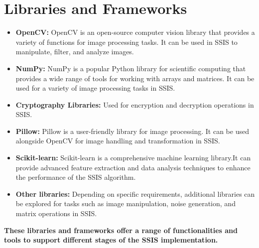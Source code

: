 \section{Libraries and Frameworks}
\begin{itemize}
\item \textbf{OpenCV:\cite{frwiki:197436603}} OpenCV is an open-source computer vision library that provides a variety of functions for image processing tasks. It can be used in SSIS to manipulate, filter, and analyze images.


\item \textbf{NumPy:\cite{frwiki:194233819}} NumPy is a popular Python library for scientific computing that provides a wide range of tools for working with arrays and matrices. It can be used for a variety of image processing tasks in SSIS.


\item \textbf{Cryptography Libraries:} Used for encryption and decryption operations in SSIS.


\item \textbf{Pillow:\cite{pillow}} Pillow is a user-friendly library for image processing. It can be used alongside OpenCV for image handling and transformation in SSIS.


\item \textbf{Scikit-learn:\cite{scikit-learn}} Scikit-learn is a comprehensive machine learning library.It can provide advanced feature extraction and data analysis techniques to enhance the performance of the SSIS algorithm.


\item \textbf{Other libraries:} Depending on specific requirements, additional libraries can be explored for tasks such as image manipulation, noise generation, and matrix operations in SSIS.
\end{itemize}

\begin{center}
\textbf{These libraries and frameworks offer a range of functionalities and tools to support different stages of the SSIS implementation.}
\end{center}


